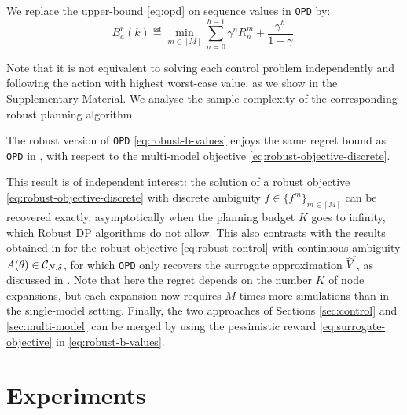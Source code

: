 \documentclass{article}
\begin{document}
\begin{definition} We replace the upper-bound \eqref{eq:opd} on sequence values in \texttt{OPD} by:
\begin{equation}
\label{eq:robust-b-values}
B_a^r(k)  \eqdef \min_{m\in[M]} \sum_{n=0}^{h-1} \gamma^n R_n^m  + \frac{\gamma^h}{1-\gamma}. 
\end{equation}
\end{definition}
Note that it is not equivalent to solving each control problem independently and following the action with highest worst-case value, as we show in the Supplementary Material. We analyse the sample complexity of the corresponding robust planning algorithm.


\begin{proposition}
\label{theorem:drop-regret}
The robust version of \texttt{OPD} \eqref{eq:robust-b-values} enjoys the same regret bound as \texttt{OPD} in , with respect to the multi-model objective \eqref{eq:robust-objective-discrete}.
\end{proposition}

This result is of independent interest: the solution of a robust objective \eqref{eq:robust-objective-discrete} with discrete ambiguity $f\in\{f^m\}_{m\in[M]}$ can be recovered exactly, asymptotically when the planning budget $K$ goes to infinity, which Robust DP algorithms do not allow. This also contrasts with the results obtained in  for the robust objective \eqref{eq:robust-control} with continuous ambiguity $A(\theta)\in\mathcal{C}_{N,\delta}$, for which \texttt{OPD} only recovers the surrogate approximation $\hat{V}^r$, as discussed in . Note that here the regret depends on the number $K$ of node expansions, but each expansion now requires $M$ times more simulations than in the single-model setting. Finally, the two approaches of Sections \ref{sec:control} and \ref{sec:multi-model} can be merged by using the pessimistic reward \eqref{eq:surrogate-objective} in \eqref{eq:robust-b-values}.

\section{Experiments}
\label{sec:experiments}
\end{document}
